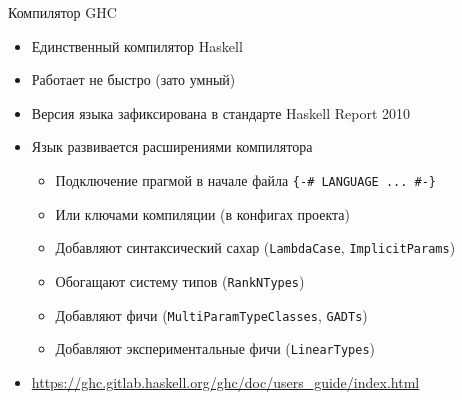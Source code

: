     \begin{frame}{Компилятор GHC}
        \begin{itemize}
            \item Единственный компилятор Haskell
            \item Работает не быстро (зато умный)
            \item Версия языка зафиксирована в стандарте Haskell Report 2010
            \item Язык развивается расширениями компилятора
            \begin{itemize}
                \item Подключение прагмой в начале файла \texttt{\{-\# LANGUAGE ... \#-\}}
                \item Или ключами компиляции (в конфигах проекта)
                \item Добавляют синтаксический сахар (\texttt{LambdaCase}, \texttt{ImplicitParams})
                \item Обогащают систему типов (\texttt{RankNTypes})
                \item Добавляют фичи (\texttt{MultiParamTypeClasses}, \texttt{GADTs})
                \item Добавляют экспериментальные фичи (\texttt{LinearTypes})
            \end{itemize}
            \item \href{https://ghc.gitlab.haskell.org/ghc/doc/users_guide/index.html}{\color{blue} https://ghc.gitlab.haskell.org/ghc/doc/users\_guide/index.html}
        \end{itemize}
    \end{frame}

